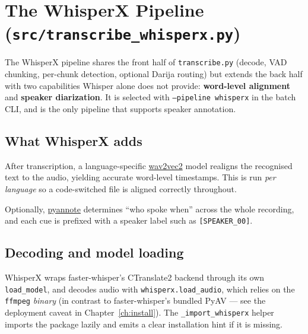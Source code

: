\documentclass[11pt,a4paper]{report}
\newcommand{\code}[1]{\texttt{\small #1}}
\begin{document}
\chapter{The WhisperX Pipeline (\texttt{src/transcribe\_whisperx.py})}
\label{ch:wx}

The WhisperX pipeline shares the front half of \texttt{transcribe.py} (decode,
VAD chunking, per-chunk detection, optional Darija routing) but extends the back
half with two capabilities Whisper alone does not provide: \textbf{word-level
alignment} and \textbf{speaker diarization}. It is selected with
\code{--pipeline whisperx} in the batch CLI, and is the only pipeline that
supports speaker annotation.

\section{What WhisperX adds}

\begin{description}[leftmargin=2em,style=nextline]
  \item[Word-level alignment] After transcription, a language-specific
        \href{https://huggingface.co/docs/transformers/model_doc/wav2vec2}{wav2vec2}
        model realigns the recognised text to the audio, yielding accurate
        word-level timestamps. This is run \emph{per language} so a code-switched
        file is aligned correctly throughout.
  \item[Speaker diarization] Optionally, \href{https://github.com/pyannote/pyannote-audio}{pyannote}
        determines ``who spoke when'' across the whole recording, and each cue is
        prefixed with a speaker label such as \code{[SPEAKER\_00]}.
\end{description}

\section{Decoding and model loading}

WhisperX wraps faster-whisper's CTranslate2 backend through its own
\code{load\_model}, and decodes audio with \code{whisperx.load\_audio}, which
relies on the \code{ffmpeg} \emph{binary} (in contrast to faster-whisper's bundled
PyAV --- see the deployment caveat in Chapter~\ref{ch:install}). The
\code{\_import\_whisperx} helper imports the package lazily and emits a clear
installation hint if it is missing.
\end{document}
